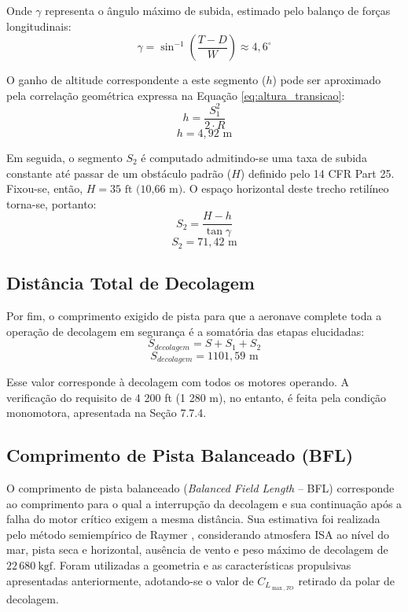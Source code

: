 Onde $\gamma$ representa o ângulo máximo de subida, estimado pelo balanço de forças longitudinais:
\begin{equation}
    \gamma = \sin^{-1}\left(\frac{T - D}{W}\right) \approx 4,6 ^\circ
\end{equation}

O ganho de altitude correspondente a este segmento ($h$) pode ser aproximado pela correlação geométrica expressa na Equação \ref{eq:altura_transicao}:
\begin{equation}
    h = \frac{S_{1}^{2}}{2 \cdot R}
    \label{eq:altura_transicao}
\end{equation}
\begin{equation}
    h = 4,92 \text{ m}
\end{equation}

Em seguida, o segmento $S_{2}$ é computado admitindo-se uma taxa de subida constante até passar de um obstáculo padrão ($H$) definido pelo 14 CFR Part 25. Fixou-se, então, $H = 35 \text{ ft (10,66 m)}$. O espaço horizontal deste trecho retilíneo torna-se, portanto:
\begin{equation}
    S_{2} = \frac{H - h}{\tan \gamma}
\end{equation}
\begin{equation}
    S_{2} = 71,42 \text{ m}
\end{equation}

\subsection{Distância Total de Decolagem}
Por fim, o comprimento exigido de pista para que a aeronave complete toda a operação de decolagem em segurança é a somatória das etapas elucidadas:
\begin{equation}
    S_{decolagem} = S + S_{1} + S_{2}
\end{equation}
\begin{equation}
    S_{decolagem} = 1101,59\text{ m}
\end{equation}

Esse valor corresponde à decolagem com todos os motores operando. A verificação do requisito de 4 200 ft (1 280 m), no entanto, é feita pela condição monomotora, apresentada na Seção 7.7.4.

\subsection{Comprimento de Pista Balanceado (BFL)}
\label{sec:bfl}
O comprimento de pista balanceado (\emph{Balanced Field Length} -- BFL) corresponde ao comprimento para o qual a interrupção da decolagem e sua continuação após a falha do motor crítico exigem a mesma distância. Sua estimativa foi realizada pelo método semiempírico de Raymer \cite{raymer2018}, considerando atmosfera ISA ao nível do mar, pista seca e horizontal, ausência de vento e peso máximo de decolagem de $22\,680~\mathrm{kgf}$. Foram utilizadas a geometria e as características propulsivas apresentadas anteriormente, adotando-se o valor de $C_{L_{\max,TO}}$ retirado da polar de decolagem.

